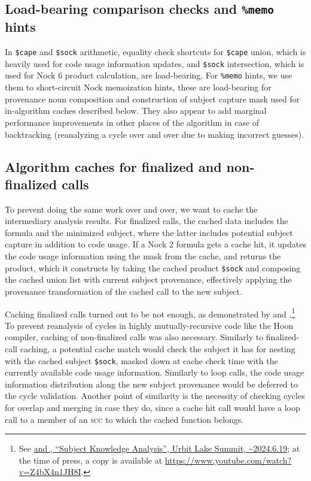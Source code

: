 \documentclass[twoside]{article}
\begin{document}
\subsection{Load-bearing comparison checks and \texttt{\%memo} hints}

In \lstinline[style=inlinecode]{$cape} and \lstinline[style=inlinecode]{$sock} arithmetic, equality check shortcuts for \lstinline[style=inlinecode]{$cape} union, which is heavily used for code usage information updates, and \lstinline[style=inlinecode]{$sock} intersection, which is used for Nock 6 product calculation, are load-bearing.  For \lstinline[style=inlinecode]{%memo} hints, we use them to short-circuit Nock memoization hints, these are load-bearing for provenance noun composition and construction of subject capture mask used for in-algorithm caches described below.  They also appear to add marginal performance improvements in other places of the algorithm in case of backtracking (reanalyzing a cycle over and over due to making incorrect guesses).

\subsection{Algorithm caches for finalized and non-finalized calls}

To prevent doing the same work over and over, we want to cache the intermediary analysis results.  For finalized calls, the cached data includes the formula and the minimized subject, where the latter includes potential subject capture in addition to code usage.  If a Nock 2 formula gets a cache hit, it updates the code usage information using the mask from the cache, and returns the product, which it constructs by taking the cached product \lstinline[style=inlinecode]{$sock} and composing the cached union list with current subject provenance, effectively applying the provenance transformation of the cached call to the new subject.

Caching finalized calls turned out to be not enough, as demonstrated by  and .\footnote{See \href{https://www.youtube.com/watch?v=Z4bX4n1JH8I}{ and , ``Subject Knowledge Analysis'', Urbit Lake Summit, \textasciitilde 2024.6.19}; at the time of press, a copy is available at \url{https://www.youtube.com/watch?v=Z4bX4n1JH8I}.}  To prevent reanalysis of cycles in highly mutually-recursive code like the Hoon compiler, caching of non-finalized calls was also necessary.  Similarly to finalized-call caching, a potential cache match would check the subject it has for nesting with the cached subject \lstinline[style=inlinecode]{$sock}, masked down at cache check time with the currently available code usage information.  Similarly to loop calls, the code usage information distribution along the new subject provenance would be deferred to the cycle validation.  Another point of similarity is the necessity of checking cycles for overlap and merging in case they do, since a cache hit call would have a loop call to a member of an \textsc{scc} to which the cached function belongs.
\end{document}
